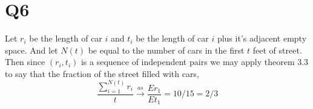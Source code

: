 \documentclass{article}
\begin{document}
\section*{Q6}
Let $r_i$ be the length of car $i$ and $t_i$ be the length of car $i$ plus it's adjacent empty space. 
And let $N(t)$ be equal to the number of cars in the first $t$ feet of street.
Then since $(r_i, t_i)$ is a sequence of independent pairs we may apply theorem 3.3 to say that the fraction of the street filled with cars,
$$
\frac{\sum_{i=1}^{N(t)} r_i}{t} \overset{as}{\to} \frac{Er_1}{Et_1} = 10 / 15 = 2/3
$$ 
\end{document}
